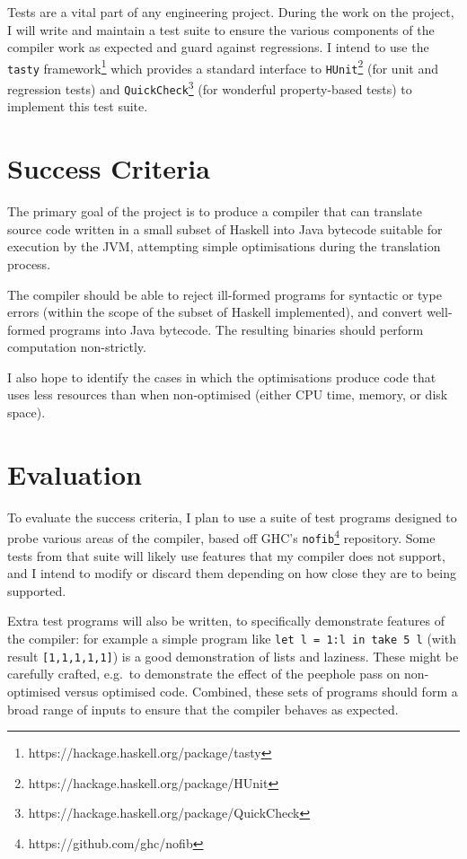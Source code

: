 \documentclass[12pt]{article}
\newcommand\haskell[1]{\texttt{#1}}
\newcommand\monospace[1]{\texttt{#1}}
\begin{document}
Tests are a vital part of any engineering project. During the work on the project, I will write and maintain a test
suite to ensure the various components of the compiler work as expected and guard against regressions. I intend to use
the \monospace{tasty} framework\footnote{https://hackage.haskell.org/package/tasty} which provides a standard interface
to \monospace{HUnit}\footnote{https://hackage.haskell.org/package/HUnit} (for unit and regression tests) and
\monospace{QuickCheck}\footnote{https://hackage.haskell.org/package/QuickCheck} (for wonderful property-based tests) to
implement this test suite.

\section*{Success Criteria}

The primary goal of the project is to produce a compiler that can translate source code written in a small subset of
Haskell into Java bytecode suitable for execution by the JVM, attempting simple optimisations during the translation
process.

The compiler should be able to reject ill-formed programs for syntactic or type errors (within the scope of the subset
of Haskell implemented), and convert well-formed programs into Java bytecode. The resulting binaries should perform
computation non-strictly.

I also hope to identify the cases in which the optimisations produce code that uses less resources than when
non-optimised (either CPU time, memory, or disk space).

\section*{Evaluation}

To evaluate the success criteria, I plan to use a suite of test programs designed to probe various areas of the
compiler, based off GHC's \monospace{nofib}\footnote{https://github.com/ghc/nofib} repository. Some tests from that
suite will likely use features that my compiler does not support, and I intend to modify or discard them depending on
how close they are to being supported.

Extra test programs will also be written, to specifically demonstrate features of the compiler: for example a simple
program like \haskell{let l = 1:l in take 5 l} (with result \haskell{[1,1,1,1,1]}) is a good demonstration of lists and
laziness. These might be carefully crafted, e.g.\ to demonstrate the effect of the peephole pass on non-optimised versus
optimised code. Combined, these sets of programs should form a broad range of inputs to ensure that the compiler behaves
as expected.
\end{document}
